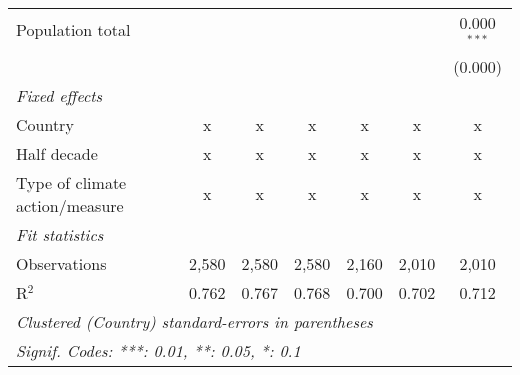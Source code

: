 \begin{tabular}{lcccccc}
   Population total                                                         &         &               &               &               &               & 0.000$^{***}$\\   
                                                                            &         &               &               &               &               & (0.000)\\   
   \emph{Fixed effects}\\
   Country                                                                  & x       & x             & x             & x             & x             & x\\  
   Half decade                                                              & x       & x             & x             & x             & x             & x\\  
   Type of climate action/measure                                           & x       & x             & x             & x             & x             & x\\  
   \midrule \emph{Fit statistics}\\
   Observations                                                             & 2,580   & 2,580         & 2,580         & 2,160         & 2,010         & 2,010\\  
   R$^2$                                                                    & 0.762   & 0.767         & 0.768         & 0.700         & 0.702         & 0.712\\  
   \midrule
   \multicolumn{7}{l}{\emph{Clustered (Country) standard-errors in parentheses}}\\
   \multicolumn{7}{l}{\emph{Signif. Codes: ***: 0.01, **: 0.05, *: 0.1}}\\
\end{tabular}
\par\endgroup


